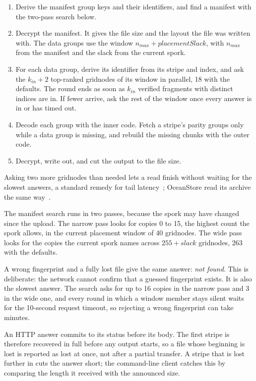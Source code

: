 \documentclass[10pt,a4paper,final]{article}
\begin{document}
\begin{enumerate}
	\item Derive the manifest group keys and their identifiers, and find a manifest with the two-pass search below.
	\item Decrypt the manifest. It gives the file size and the layout the file was written with. The data groups
	      use the window $n_{max} + \mathit{placementSlack}$, with $n_{max}$ from the manifest and the slack from the
	      current spork.
	\item For each data group, derive its identifier from its stripe and index, and ask the $k_{in} + 2$
	      top-ranked gridnodes of its window in parallel, 18 with the defaults. The round ends as soon as $k_{in}$
	      verified fragments with distinct indices are in. If fewer arrive, ask the rest of the window once every
	      answer is in or has timed out.
	\item Decode each group with the inner code. Fetch a stripe's parity groups only while a data group is missing,
	      and rebuild the missing chunks with the outer code.
	\item Decrypt, write out, and cut the output to the file size.
\end{enumerate}

Asking two more gridnodes than needed lets a read finish without waiting for the slowest answers, a standard remedy
for tail latency~\cite{dean2013}; OceanStore read its archive the same way~\cite{kubiatowicz2000}.

The manifest search runs in two passes, because the spork may have changed since the upload. The narrow pass looks
for copies 0 to 15, the highest count the spork allows, in the current placement window of 40 gridnodes. The wide
pass looks for the copies the current spork names across $255 + \mathit{slack}$ gridnodes, 263 with the defaults.

A wrong fingerprint and a fully lost file give the same answer: \emph{not found}. This is deliberate: the network
cannot confirm that a guessed fingerprint exists. It is also the slowest answer. The search asks for up to 16
copies in the narrow pass and 3 in the wide one, and every round in which a window member stays silent waits for
the 10-second request timeout, so rejecting a wrong fingerprint can take minutes.

An HTTP answer commits to its status before its body. The first stripe is therefore recovered in full before any
output starts, so a file whose beginning is lost is reported as lost at once, not after a partial transfer. A stripe
that is lost further in cuts the answer short; the command-line client catches this by comparing the length it
received with the announced size.
\end{document}
